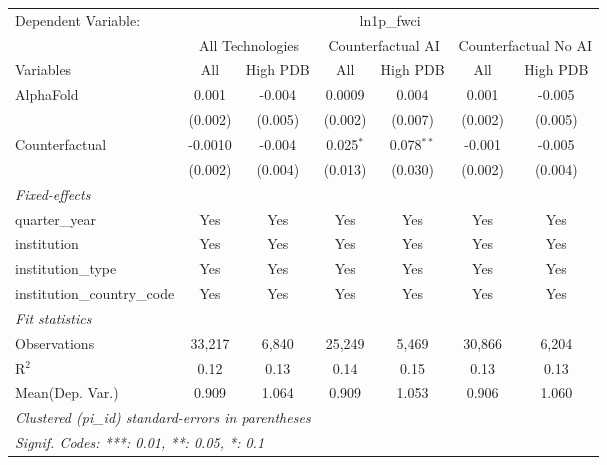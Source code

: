 \begingroup
\centering
\begin{tabular}{lcccccc}
   \tabularnewline \midrule \midrule
   Dependent Variable: & \multicolumn{6}{c}{ln1p\_fwci}\\
 & \multicolumn{2}{c}{All Technologies} & \multicolumn{2}{c}{Counterfactual AI} & \multicolumn{2}{c}{Counterfactual No AI} \\
\cmidrule(lr){1-1}\cmidrule(lr){2-3} \cmidrule(lr){4-5} \cmidrule(lr){6-7}
Variables & \multicolumn{1}{c}{All} & \multicolumn{1}{c}{High PDB} & \multicolumn{1}{c}{All} & \multicolumn{1}{c}{High PDB} & \multicolumn{1}{c}{All} & \multicolumn{1}{c}{High PDB} \\
\cmidrule(lr){1-1}\cmidrule(lr){2-2} \cmidrule(lr){3-3} \cmidrule(lr){4-4} \cmidrule(lr){5-5} \cmidrule(lr){6-6} \cmidrule(lr){7-7}
   AlphaFold                    & 0.001   & -0.004  & 0.0009      & 0.004        & 0.001   & -0.005\\   
                                & (0.002) & (0.005) & (0.002)     & (0.007)      & (0.002) & (0.005)\\   
   Counterfactual               & -0.0010 & -0.004  & 0.025$^{*}$ & 0.078$^{**}$ & -0.001  & -0.005\\   
                                & (0.002) & (0.004) & (0.013)     & (0.030)      & (0.002) & (0.004)\\   
   \midrule
   \emph{Fixed-effects}\\
   quarter\_year                & Yes     & Yes     & Yes         & Yes          & Yes     & Yes\\  
   institution                  & Yes     & Yes     & Yes         & Yes          & Yes     & Yes\\  
   institution\_type            & Yes     & Yes     & Yes         & Yes          & Yes     & Yes\\  
   institution\_country\_code   & Yes     & Yes     & Yes         & Yes          & Yes     & Yes\\  
   \midrule
   \emph{Fit statistics}\\
   Observations                 & 33,217  & 6,840   & 25,249      & 5,469        & 30,866  & 6,204\\  
   R$^2$                        & 0.12    & 0.13    & 0.14        & 0.15         & 0.13    & 0.13\\  
Mean(Dep. Var.) & 0.909 & 1.064 & 0.909 & 1.053 & 0.906 & 1.060 \\
   \midrule \midrule
   \multicolumn{7}{l}{\emph{Clustered (pi\_id) standard-errors in parentheses}}\\
   \multicolumn{7}{l}{\emph{Signif. Codes: ***: 0.01, **: 0.05, *: 0.1}}\\
\end{tabular}
\par\endgroup
